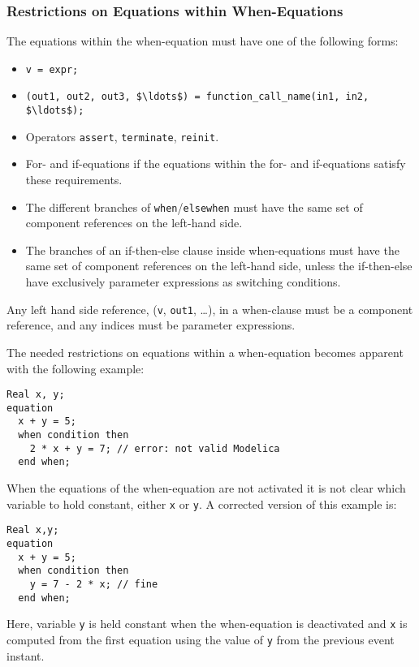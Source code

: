 \subsubsection{Restrictions on Equations within When-Equations}\label{restrictions-on-equations-within-when-equations}

The equations within the when-equation must have one of the following forms:
\begin{itemize}
\item
  \lstinline!v = expr;!
\item
  \lstinline!(out1, out2, out3, $\ldots$) = function_call_name(in1, in2, $\ldots$);!
\item
  Operators \lstinline!assert!, \lstinline!terminate!, \lstinline!reinit!.
\item
  For- and if-equations if the equations within the for- and if-equations satisfy these requirements.
\item
  The different branches of \lstinline!when!/\lstinline!elsewhen! must have the same set of component references on the left-hand side.
\item
  The branches of an if-then-else clause inside when-equations must have the same set of component references on the left-hand side, unless the if-then-else have exclusively parameter expressions as switching conditions.
\end{itemize}

Any left hand side reference, (\lstinline!v!, \lstinline!out1!, \ldots), in a when-clause must
be a component reference, and any indices must be parameter expressions.

\begin{nonnormative}
The needed restrictions on equations within a when-equation becomes apparent with the following example:
\begin{lstlisting}[language=modelica]
  Real x, y;
equation
  x + y = 5;
  when condition then
    2 * x + y = 7; // error: not valid Modelica
  end when;
\end{lstlisting}

When the equations of the when-equation are not activated it is not clear which variable to hold constant, either \lstinline!x! or \lstinline!y!.
A corrected version of this example is:
\begin{lstlisting}[language=modelica]
  Real x,y;
equation
  x + y = 5;
  when condition then
    y = 7 - 2 * x; // fine
  end when;
\end{lstlisting}
Here, variable \lstinline!y! is held constant when the when-equation is
deactivated and \lstinline!x! is computed from the first equation using the
value of \lstinline!y! from the previous event instant.
\end{nonnormative}

